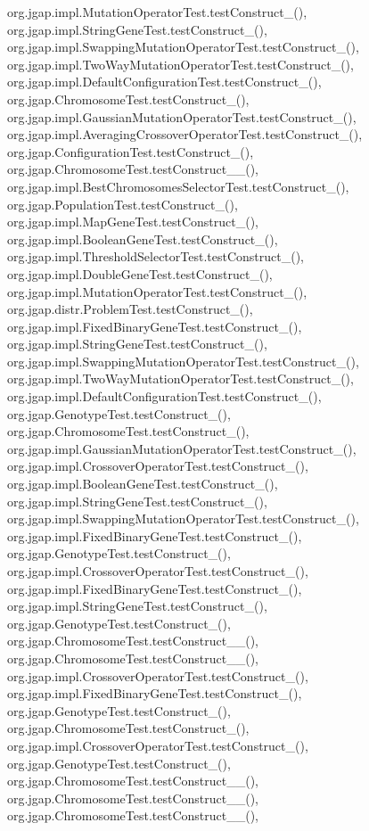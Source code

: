 org.\-jgap.\-impl.\-Mutation\-Operator\-Test.\-test\-Construct\-\_(), org.\-jgap.\-impl.\-String\-Gene\-Test.\-test\-Construct\-\_(), org.\-jgap.\-impl.\-Swapping\-Mutation\-Operator\-Test.\-test\-Construct\-\_(), org.\-jgap.\-impl.\-Two\-Way\-Mutation\-Operator\-Test.\-test\-Construct\-\_(), org.\-jgap.\-impl.\-Default\-Configuration\-Test.\-test\-Construct\-\_(), org.\-jgap.\-Chromosome\-Test.\-test\-Construct\-\_(), org.\-jgap.\-impl.\-Gaussian\-Mutation\-Operator\-Test.\-test\-Construct\-\_(), org.\-jgap.\-impl.\-Averaging\-Crossover\-Operator\-Test.\-test\-Construct\-\_(), org.\-jgap.\-Configuration\-Test.\-test\-Construct\-\_(), org.\-jgap.\-Chromosome\-Test.\-test\-Construct\-\_\-\_(), org.\-jgap.\-impl.\-Best\-Chromosomes\-Selector\-Test.\-test\-Construct\-\_(), org.\-jgap.\-Population\-Test.\-test\-Construct\-\_(), org.\-jgap.\-impl.\-Map\-Gene\-Test.\-test\-Construct\-\_(), org.\-jgap.\-impl.\-Boolean\-Gene\-Test.\-test\-Construct\-\_(), org.\-jgap.\-impl.\-Threshold\-Selector\-Test.\-test\-Construct\-\_(), org.\-jgap.\-impl.\-Double\-Gene\-Test.\-test\-Construct\-\_(), org.\-jgap.\-impl.\-Mutation\-Operator\-Test.\-test\-Construct\-\_(), org.\-jgap.\-distr.\-Problem\-Test.\-test\-Construct\-\_(), org.\-jgap.\-impl.\-Fixed\-Binary\-Gene\-Test.\-test\-Construct\-\_(), org.\-jgap.\-impl.\-String\-Gene\-Test.\-test\-Construct\-\_(), org.\-jgap.\-impl.\-Swapping\-Mutation\-Operator\-Test.\-test\-Construct\-\_(), org.\-jgap.\-impl.\-Two\-Way\-Mutation\-Operator\-Test.\-test\-Construct\-\_(), org.\-jgap.\-impl.\-Default\-Configuration\-Test.\-test\-Construct\-\_(), org.\-jgap.\-Genotype\-Test.\-test\-Construct\-\_(), org.\-jgap.\-Chromosome\-Test.\-test\-Construct\-\_(), org.\-jgap.\-impl.\-Gaussian\-Mutation\-Operator\-Test.\-test\-Construct\-\_(), org.\-jgap.\-impl.\-Crossover\-Operator\-Test.\-test\-Construct\-\_(), org.\-jgap.\-impl.\-Boolean\-Gene\-Test.\-test\-Construct\-\_(), org.\-jgap.\-impl.\-String\-Gene\-Test.\-test\-Construct\-\_(), org.\-jgap.\-impl.\-Swapping\-Mutation\-Operator\-Test.\-test\-Construct\-\_(), org.\-jgap.\-impl.\-Fixed\-Binary\-Gene\-Test.\-test\-Construct\-\_(), org.\-jgap.\-Genotype\-Test.\-test\-Construct\-\_(), org.\-jgap.\-impl.\-Crossover\-Operator\-Test.\-test\-Construct\-\_(), org.\-jgap.\-impl.\-Fixed\-Binary\-Gene\-Test.\-test\-Construct\-\_(), org.\-jgap.\-impl.\-String\-Gene\-Test.\-test\-Construct\-\_(), org.\-jgap.\-Genotype\-Test.\-test\-Construct\-\_(), org.\-jgap.\-Chromosome\-Test.\-test\-Construct\-\_\-\_(), org.\-jgap.\-Chromosome\-Test.\-test\-Construct\-\_\-\_(), org.\-jgap.\-impl.\-Crossover\-Operator\-Test.\-test\-Construct\-\_(), org.\-jgap.\-impl.\-Fixed\-Binary\-Gene\-Test.\-test\-Construct\-\_(), org.\-jgap.\-Genotype\-Test.\-test\-Construct\-\_(), org.\-jgap.\-Chromosome\-Test.\-test\-Construct\-\_(), org.\-jgap.\-impl.\-Crossover\-Operator\-Test.\-test\-Construct\-\_(), org.\-jgap.\-Genotype\-Test.\-test\-Construct\-\_(), org.\-jgap.\-Chromosome\-Test.\-test\-Construct\-\_\-\_(), org.\-jgap.\-Chromosome\-Test.\-test\-Construct\-\_\-\_(), org.\-jgap.\-Chromosome\-Test.\-test\-Construct\-\_\-\_(), 